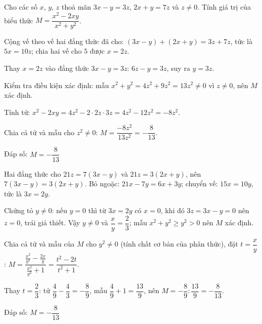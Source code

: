 \begin{problem}[8DS-PS-018]
Cho các số $x$, $y$, $z$ thoả mãn $3x - y = 3z$, $2x + y = 7z$ và $z \neq 0$. Tính giá trị của biểu thức $M = \dfrac{x^2 - 2xy}{x^2 + y^2}$.

\begin{solution}
Cộng vế theo vế hai đẳng thức đã cho: $(3x - y) + (2x + y) = 3z + 7z$, tức là $5x = 10z$; chia hai vế cho $5$ được $x = 2z$.

Thay $x = 2z$ vào đẳng thức $3x - y = 3z$: $6z - y = 3z$, suy ra $y = 3z$.

Kiểm tra điều kiện xác định: mẫu $x^2 + y^2 = 4z^2 + 9z^2 = 13z^2 \neq 0$ vì $z \neq 0$, nên $M$ xác định.

Tính tử: $x^2 - 2xy = 4z^2 - 2 \cdot 2z \cdot 3z = 4z^2 - 12z^2 = -8z^2$.

Chia cả tử và mẫu cho $z^2 \neq 0$: $M = \dfrac{-8z^2}{13z^2} = -\dfrac{8}{13}$.

Đáp số: $\boxed{M = -\dfrac{8}{13}}$
\end{solution}

\begin{solution}
Hai đẳng thức cho $21z = 7(3x - y)$ và $21z = 3(2x + y)$, nên $7(3x - y) = 3(2x + y)$. Bỏ ngoặc: $21x - 7y = 6x + 3y$; chuyển vế: $15x = 10y$, tức là $3x = 2y$.

Chứng tỏ $y \neq 0$: nếu $y = 0$ thì từ $3x = 2y$ có $x = 0$, khi đó $3z = 3x - y = 0$ nên $z = 0$, trái giả thiết. Vậy $y \neq 0$ và $\dfrac{x}{y} = \dfrac{2}{3}$; mẫu $x^2 + y^2 \geq y^2 > 0$ nên $M$ xác định.

Chia cả tử và mẫu của $M$ cho $y^2 \neq 0$ (tính chất cơ bản của phân thức), đặt $t = \dfrac{x}{y}$: $M = \dfrac{\frac{x^2}{y^2} - \frac{2x}{y}}{\frac{x^2}{y^2} + 1} = \dfrac{t^2 - 2t}{t^2 + 1}$.

Thay $t = \dfrac{2}{3}$: tử $\dfrac{4}{9} - \dfrac{4}{3} = -\dfrac{8}{9}$, mẫu $\dfrac{4}{9} + 1 = \dfrac{13}{9}$, nên $M = -\dfrac{8}{9} : \dfrac{13}{9} = -\dfrac{8}{13}$.

Đáp số: $\boxed{M = -\dfrac{8}{13}}$
\end{solution}
\end{problem}

